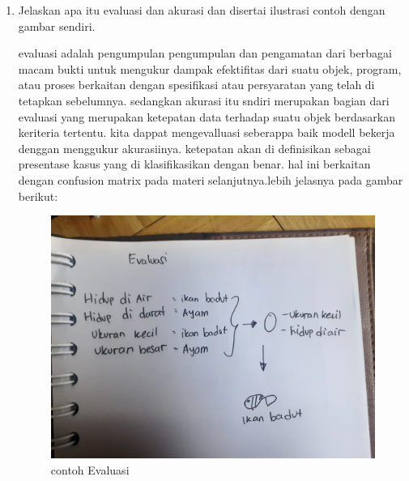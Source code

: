 \begin{enumerate}
		\item Jelaskan apa itu evaluasi dan akurasi dan disertai ilustrasi contoh dengan gambar sendiri.\par
		evaluasi adalah pengumpulan pengumpulan dan pengamatan dari berbagai macam bukti untuk mengukur dampak efektifitas dari suatu objek, program, atau proses berkaitan  dengan spesifikasi atau persyaratan yang telah di tetapkan sebelumnya. sedangkan akurasi itu sndiri merupakan bagian dari evaluasi yang merupakan ketepatan data terhadap suatu objek berdasarkan keriteria tertentu. kita dappat mengevalluasi seberappa baik modell bekerja denggan menggukur akurasiinya. ketepatan akan di definisikan sebagai presentase kasus yang di klasifikasikan dengan benar. hal ini berkaitan dengan confusion matrix pada materi selanjutnya.lebih jelasnya pada gambar berikut:
		\begin{figure}[ht]
			\centering
			\includegraphics[scale=0.01]{figures/1174043/chapter2/5.jpg}
			\caption{contoh Evaluasi}
			\label{contoh}
		\end{figure}
		

\end{enumerate}
